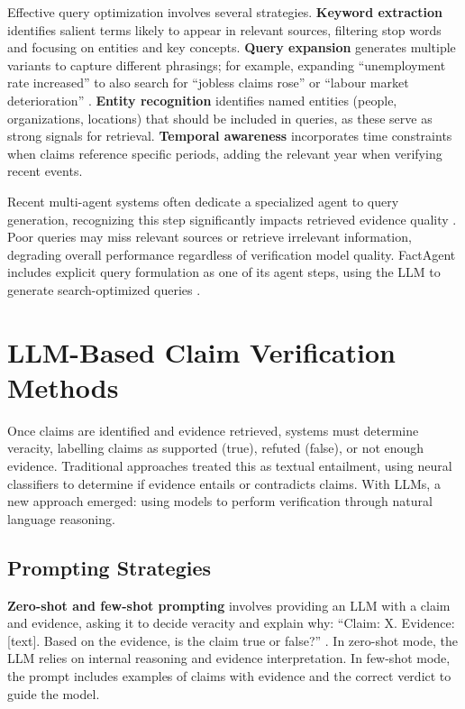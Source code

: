 \documentclass[12pt,a4paper]{article}
\begin{document}
Effective query optimization involves several strategies. \textbf{Keyword extraction} identifies salient terms likely to appear in relevant sources, filtering stop words and focusing on entities and key concepts. \textbf{Query expansion} generates multiple variants to capture different phrasings; for example, expanding ``unemployment rate increased'' to also search for ``jobless claims rose'' or ``labour market deterioration'' \citep{lewis2020retrieval}. \textbf{Entity recognition} identifies named entities (people, organizations, locations) that should be included in queries, as these serve as strong signals for retrieval. \textbf{Temporal awareness} incorporates time constraints when claims reference specific periods, adding the relevant year when verifying recent events.

Recent multi-agent systems often dedicate a specialized agent to query generation, recognizing this step significantly impacts retrieved evidence quality \citep{hysonlab2025factagent}. Poor queries may miss relevant sources or retrieve irrelevant information, degrading overall performance regardless of verification model quality. FactAgent includes explicit query formulation as one of its agent steps, using the LLM to generate search-optimized queries \citep{hysonlab2025factagent}.

\section{LLM-Based Claim Verification Methods}

Once claims are identified and evidence retrieved, systems must determine veracity, labelling claims as supported (true), refuted (false), or not enough evidence. Traditional approaches treated this as textual entailment, using neural classifiers to determine if evidence entails or contradicts claims. With LLMs, a new approach emerged: using models to perform verification through natural language reasoning.

\subsection{Prompting Strategies}

\textbf{Zero-shot and few-shot prompting} involves providing an LLM with a claim and evidence, asking it to decide veracity and explain why: ``Claim: X. Evidence: [text]. Based on the evidence, is the claim true or false?'' \citep{zhang2023siren}. In zero-shot mode, the LLM relies on internal reasoning and evidence interpretation. In few-shot mode, the prompt includes examples of claims with evidence and the correct verdict to guide the model.
\end{document}
